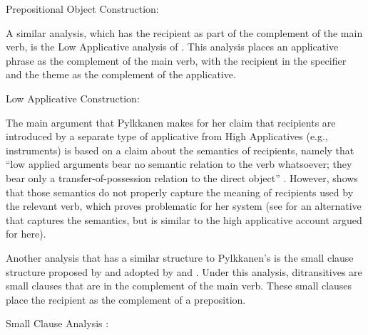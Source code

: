 \begin{exe}
	\ex Prepositional Object Construction:\label{ex:POC} \\
\end{exe}


A similar analysis, which has the recipient as part of the complement of the main verb, is the Low Applicative analysis of \cite{Pylkkanen.2001}. This analysis places an applicative phrase as the complement of the main verb, with the recipient in the specifier and the theme as the complement of the applicative. 
\begin{exe}
\ex Low Applicative Construction: \\
\end{exe}

The main argument that Pylkkanen makes for her claim that recipients are introduced by a separate type of applicative from High Applicatives (e.g., instruments) is based on a claim about the semantics of recipients, namely that ``low applied arguments bear no semantic relation to the verb whatsoever; they bear only a transfer-of-possession relation to the direct object'' \citep{Pylkkanen.2008}. However, \cite{Larson.2010} shows that those semantics do not properly capture the meaning of recipients used by the relevant verb, which proves problematic for her system (see \citealt{Georgala.2012} for an alternative that captures the semantics, but is similar to the high applicative account argued for here).

Another analysis that has a similar structure to Pylkkanen's is the small clause structure proposed by \cite{DenDikken.1995} and adopted by \cite{Harley.2002,Harley.2015} and \cite{Ormazabal.2012}. Under this analysis, ditransitives are small clauses that are in the complement of the main verb. These small clauses place the recipient as the complement of a preposition.

\begin{exe}
	\ex Small Clause Analysis \citep[ simplified from ex. 38]{DenDikken.1995}:\\
\end{exe}

